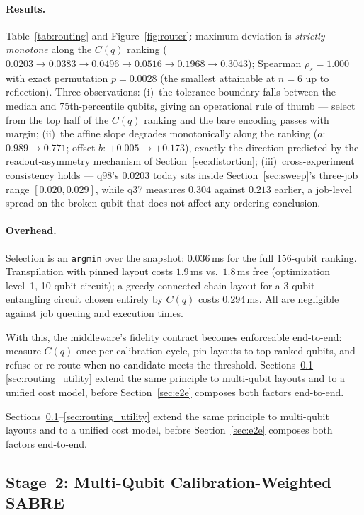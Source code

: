 ﻿\documentclass[12pt,a4paper]{article}
\begin{document}
\paragraph{Results.} Table~\ref{tab:routing} and Figure~\ref{fig:router}: maximum deviation is \emph{strictly monotone} along the $C(q)$ ranking ($0.0203 \to 0.0383 \to 0.0496 \to 0.0516 \to 0.1968 \to 0.3043$); Spearman $\rho_s = 1.000$ with exact permutation $p = 0.0028$ (the smallest attainable at $n{=}6$ up to reflection). Three observations: (i)~the tolerance boundary falls between the median and 75th-percentile qubits, giving an operational rule of thumb --- select from the top half of the $C(q)$ ranking and the bare encoding passes with margin; (ii)~the affine slope degrades monotonically along the ranking ($a$: $0.989 \to 0.771$; offset $b$: $+0.005 \to +0.173$), exactly the direction predicted by the readout-asymmetry mechanism of Section~\ref{sec:distortion}; (iii)~cross-experiment consistency holds --- q98's $0.0203$ today sits inside Section~\ref{sec:sweep}'s three-job range $[0.020, 0.029]$, while q37 measures $0.304$ against $0.213$ earlier, a job-level spread on the broken qubit that does not affect any ordering conclusion.

\paragraph{Overhead.} Selection is an \texttt{argmin} over the snapshot: $0.036$\,ms for the full 156-qubit ranking. Transpilation with pinned layout costs $1.9$\,ms vs.\ $1.8$\,ms free (optimization level~1, 10-qubit circuit); a greedy connected-chain layout for a 3-qubit entangling circuit chosen entirely by $C(q)$ costs $0.294$\,ms. All are negligible against job queuing and execution times.

With this, the middleware's fidelity contract becomes enforceable end-to-end: measure $C(q)$ once per calibration cycle, pin layouts to top-ranked qubits, and refuse or re-route when no candidate meets the threshold. Sections~\ref{sec:routing_mq}--\ref{sec:routing_utility} extend the same principle to multi-qubit layouts and to a unified cost model, before Section~\ref{sec:e2e} composes both factors end-to-end.

Sections~\ref{sec:routing_mq}--\ref{sec:routing_utility} extend the same principle to multi-qubit layouts and to a unified cost model, before Section~\ref{sec:e2e} composes both factors end-to-end.

\subsection{Stage~2: Multi-Qubit Calibration-Weighted SABRE}\label{sec:routing_mq}
\end{document}
